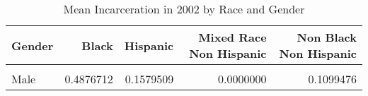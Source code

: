 \begin{table}[H]

\caption{\label{tab:tab:summarystats}Mean Incarceration in 2002 by Race and Gender}
\centering
\begin{tabular}[t]{lrrrr}
\toprule
Gender & Black & Hispanic & Mixed Race Non Hispanic & Non Black Non Hispanic\\
\midrule
\cellcolor{gray!6}{Female} & \cellcolor{gray!6}{0.0211268} & \cellcolor{gray!6}{0.0298013} & \cellcolor{gray!6}{0.1428571} & \cellcolor{gray!6}{0.0193192}\\
Male & 0.4876712 & 0.1579509 & 0.0000000 & 0.1099476\\
\bottomrule
\end{tabular}
\end{table}
